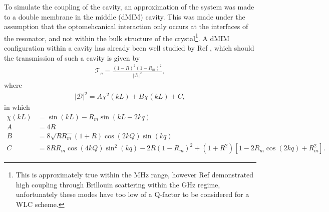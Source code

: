 \documentclass[aps,  
                a4paper, 
                amsmath, 
                amssymb, 
                preprint,
                tightenlines,  
                amsfonts,
                nofootinbib,
                onecolumn,
                titlepage,
                10pt
            ]{revtex4-2}
\begin{document}
    To simulate the coupling of the cavity, an approximation of the system was made to a double membrane in the middle (dMIM) cavity. This was made under the assumption that the optomehcanical interaction only occurs at the interfaces of the resonator, and not within the bulk structure of the crystal\footnote{This is approximately true within the MHz range, however Ref \cite{kharel2019} demonstrated high coupling through Brillouin scattering within the GHz regime, unfortunately these modes have too low of a Q-factor to be considered for a WLC scheme.}. A dMIM configuration within a cavity has already been well studied by Ref \cite{li2016}, which should the transmission of such a cavity is given by
    \begin{align}
        \label{eq:transmission-dmim}
        \mathcal{T}_c=\frac{(1-R)^2(1-R_m)^2}{\vert\mathcal{D}\vert^2},
    \end{align} 
    where
    \begin{align}
        \label{eq:transmission-dmim-denom}
        \vert\mathcal{D}\vert^2=A\chi^2(kL)+B\chi(kL)+C,
    \end{align}
    in which
    \begin{align}
        \chi(kL)&=\sin({kL})-R_m\sin{(kL-2kq)}\nonumber\\
        A&=4R\nonumber\\
        B&=8\sqrt{RR_m}(1+R)\cos{(2kQ)}\sin{(kq)}\nonumber\\
        C&=8RR_m\cos(4kQ)\sin^2(kq)-2R(1-R_m)^2+(1+R^2)[1-2R_m\cos(2kq)+R_m^2].
    \end{align}
\end{document}
